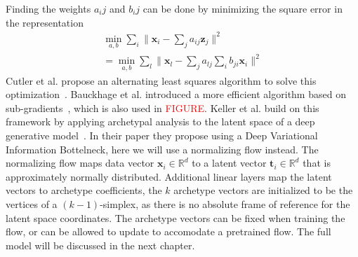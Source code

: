 Finding the weights $a_ij$ and $b_ij$ can be done by minimizing the square
error in the representation
\begin{equation}
    \begin{aligned}
        \label{eq:archetype_rss}
        \min_{a,b} \sum_i \lVert \mathbf{x}_i - \sum_j a_{ij} \mathbf{z}_j
        \rVert^2 \\
        = \min_{a,b} \sum_l \lVert \mathbf{x}_l - \sum_j a_{lj} \sum_i
        b_{ji} \mathbf{x}_i \rVert^2
    \end{aligned}
\end{equation}
Cutler et al. propose an alternating least squares
algorithm to solve this optimization~\citep{cutlerArchetypalAnalysis1994}.
Bauckhage et al. introduced a more efficient algorithm based on
sub-gradients~\citep{bauckhageArchetypalAnalysisAutoencoder2015}, which is also
used in \textcolor{red}{FIGURE}.
Keller et al. build on this framework by applying archetypal analysis to the
latent space of a deep generative
model~\citep{kellerLearningExtremalRepresentations2020}. In their paper they
propose using a Deep Variational Information Bottelneck, here we will use a
normalizing flow instead. The normalizing flow maps data vector $\mathbf{x}_i
\in \mathbb{R}^d$ to a latent vector $\mathbf{t}_i \in \mathbb{R}^d$ that is
approximately normally distributed. Additional linear layers map the latent
vectors to archetype coefficients, the $k$ archetype vectors are initialized to
be the vertices of a $(k-1)$-simplex, as there is no absolute frame of
reference for the latent space coordinates. The archetype vectors can be fixed
when training the flow, or can be allowed to update to accomodate a pretrained
flow. The full model will be discussed in the next chapter.

